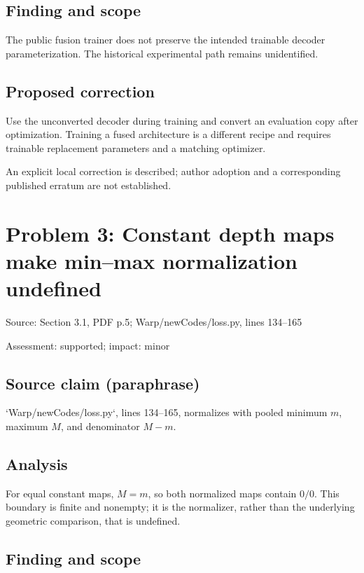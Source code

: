 \documentclass[11pt]{article}
\begin{document}
\subsection*{Finding and scope}

The public fusion trainer does not preserve the intended trainable decoder parameterization. The historical experimental path remains unidentified.

\subsection*{Proposed correction}

Use the unconverted decoder during training and convert an evaluation copy after optimization. Training a fused architecture is a different recipe and requires trainable replacement parameters and a matching optimizer.

An explicit local correction is described; author adoption and a corresponding published erratum are not established.

\section*{Problem 3: Constant depth maps make min–max normalization undefined}

Source: Section 3.1, PDF p.5; Warp/newCodes/loss.py, lines 134–165

Assessment: supported; impact: minor

\subsection*{Source claim (paraphrase)}

`Warp/newCodes/loss.py`, lines 134–165, normalizes with pooled minimum \(m\), maximum \(M\), and denominator \(M-m\).

\subsection*{Analysis}

For equal constant maps, \(M=m\), so both normalized maps contain \(0/0\). This boundary is finite and nonempty; it is the normalizer, rather than the underlying geometric comparison, that is undefined.

\subsection*{Finding and scope}
\end{document}
